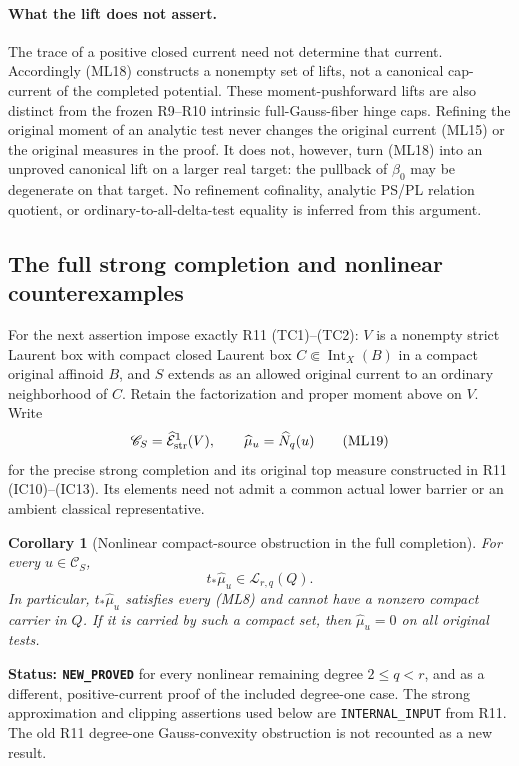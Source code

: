 \documentclass[11pt,a4paper]{article}
\numberwithin{equation}{section}
\newtheorem{corollary}[theorem]{Corollary}
\theoremstyle{definition}
\theoremstyle{remark}
\begin{document}
\paragraph{What the lift does not assert.}
The trace of a positive closed current need not determine that
current.  Accordingly \textup{(ML18)} constructs a nonempty set
of lifts, not a canonical cap-current of the completed potential.
These moment-pushforward lifts are also distinct from the frozen
R9--R10 intrinsic full-Gauss-fiber hinge caps.  Refining the original
moment of an analytic test never changes the original current
\textup{(ML15)} or the original measures in the proof.  It does
not, however, turn \textup{(ML18)} into an unproved canonical
lift on a larger real target: the pullback of $\beta_0$ may be
degenerate on that target.  No refinement cofinality, analytic
PS/PL relation quotient, or ordinary-to-all-delta-test equality
is inferred from this argument.

\subsection{The full strong completion and nonlinear counterexamples}

For the next assertion impose exactly R11 \textup{(TC1)--(TC2)}:
$V$ is a nonempty strict Laurent box with compact closed Laurent
box $C\Subset\operatorname{Int}_X(B)$ in a compact original
affinoid $B$, and $S$ extends as an allowed original current to an
ordinary neighborhood of $C$.  Retain the factorization and proper
moment above on $V$.  Write
\[
 \mathscr C_S=\widehat{\mathcal E}^{1}_{\rm str}(V),
 \qquad \widehat\mu_u=\widehat N_q(u)
 \tag{ML19}
\]
for the precise strong completion and its original top measure
constructed in R11 \textup{(IC10)--(IC13)}.  Its elements need
not admit a common actual lower barrier or an ambient classical
representative.

\begin{corollary}[Nonlinear compact-source obstruction in the full completion]
\label{cor:r12-completed-nonlinear-source-obstruction}
For every $u\in\mathscr C_S$,
\[
                      t_*\widehat\mu_u\in\mathscr L_{r,q}(Q).
 \tag{ML20}
\]
In particular, $t_*\widehat\mu_u$ satisfies every
\textup{(ML8)} and cannot have a nonzero compact carrier in $Q$.
If it is carried by such a compact set, then
$\widehat\mu_u=0$ on all original tests.
\end{corollary}

\noindent\textbf{Status: \texttt{NEW\_PROVED}} for every
nonlinear remaining degree $2\le q<r$, and as a different,
positive-current proof of the included degree-one case.  The
strong approximation and clipping assertions used below are
\texttt{INTERNAL\_INPUT} from R11.  The old R11 degree-one
Gauss-convexity obstruction is not recounted as a new result.
\end{document}
